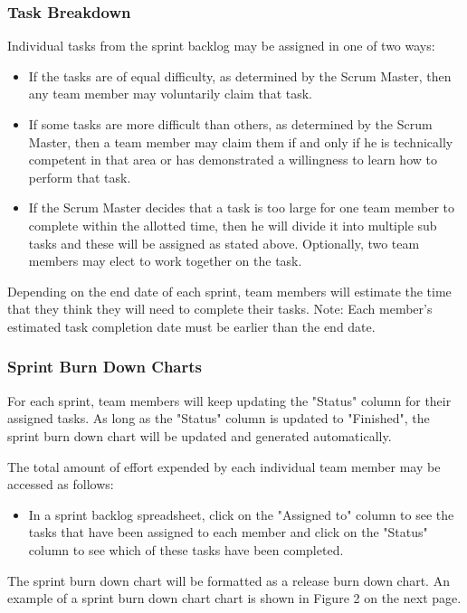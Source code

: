 \subsubsection{Task Breakdown}
Individual tasks from the sprint backlog may be assigned in one of two ways: 
\begin{itemize}

\item If the tasks are of equal difficulty, as determined by the Scrum Master, then any team member may voluntarily claim that task.

\item If some tasks are more difficult than others, as determined by the Scrum Master, then a team member may claim them if and only if he is technically competent in that area or has demonstrated a willingness to learn how to perform that task. 

\item If the Scrum Master decides that a task is too large for one team member to complete within the allotted time, then he will divide it into multiple sub tasks and these will be assigned as stated above. Optionally, two team members may elect to work together on the task. 

\end{itemize}
Depending on the end date of each sprint, team members will estimate the time that they think they will need to complete their tasks. Note: Each member's estimated task completion date must be earlier than the end date. 

\subsubsection{Sprint Burn Down Charts}
For each sprint, team members will keep updating the "Status" column for their assigned tasks. As long as the "Status" column is updated to "Finished", the sprint burn down chart will be updated and generated automatically. 

The total amount of effort expended by each individual team member may be accessed as follows:

\begin{itemize}
    
\item In a sprint backlog spreadsheet, click on the "Assigned to" column to see the tasks that have been assigned to each member and click on the "Status" column to see which of these tasks have been completed. 

\end{itemize}
The sprint burn down chart will be formatted as a release burn down chart.
An example of a sprint burn down chart chart is shown in Figure 2 on the next page.

